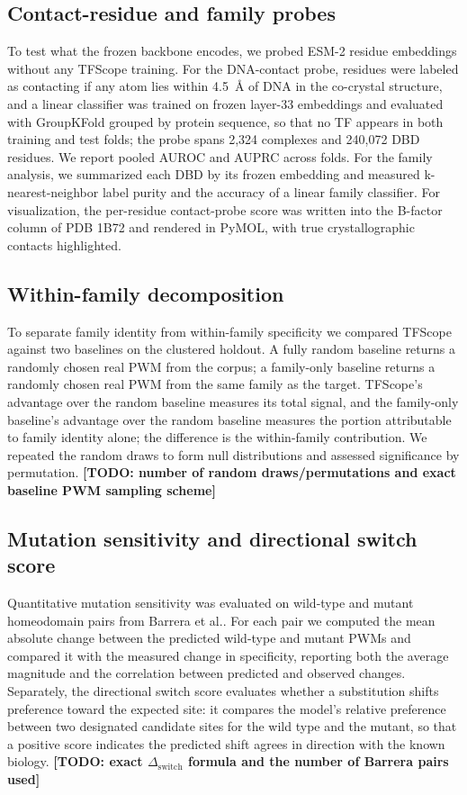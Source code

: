 \documentclass[11pt]{article}
\newcommand{\TODO}[1]{{\color{red}\textbf{[TODO: #1]}}}
\begin{document}
\subsection*{Contact-residue and family probes}
To test what the frozen backbone encodes, we probed ESM-2 residue embeddings without any
TFScope training. For the DNA-contact probe, residues were labeled as contacting if any
atom lies within \SI{4.5}{\angstrom} of DNA in the co-crystal structure, and a linear
classifier was trained on frozen layer-33 embeddings and evaluated with GroupKFold
grouped by protein sequence, so that no TF appears in both training and test folds; the
probe spans 2{,}324 complexes and 240{,}072 DBD residues. We report pooled AUROC and
AUPRC across folds. For the family analysis, we summarized each DBD by its frozen
embedding and measured k-nearest-neighbor label purity and the accuracy of a linear
family classifier. For visualization, the per-residue contact-probe score was written
into the B-factor column of PDB 1B72 and rendered in PyMOL, with true crystallographic
contacts highlighted.

\subsection*{Within-family decomposition}
To separate family identity from within-family specificity we compared TFScope against
two baselines on the clustered holdout. A fully random baseline returns a randomly
chosen real PWM from the corpus; a family-only baseline returns a randomly chosen real
PWM from the same family as the target. TFScope's advantage over the random baseline
measures its total signal, and the family-only baseline's advantage over the random
baseline measures the portion attributable to family identity alone; the difference is
the within-family contribution. We repeated the random draws to form null distributions
and assessed significance by permutation.
\TODO{number of random draws/permutations and exact baseline PWM sampling scheme}

\subsection*{Mutation sensitivity and directional switch score}
Quantitative mutation sensitivity was evaluated on wild-type and mutant homeodomain
pairs from Barrera et al.\cite{barrera2016survey}. For each pair we computed the mean
absolute change between the predicted wild-type and mutant PWMs and compared it with the
measured change in specificity, reporting both the average magnitude and the correlation
between predicted and observed changes. Separately, the directional switch score
evaluates whether a substitution shifts preference toward the expected site: it compares
the model's relative preference between two designated candidate sites for the wild type
and the mutant, so that a positive score indicates the predicted shift agrees in
direction with the known biology.
\TODO{exact $\Delta_{\mathrm{switch}}$ formula and the number of Barrera pairs used}
\end{document}

